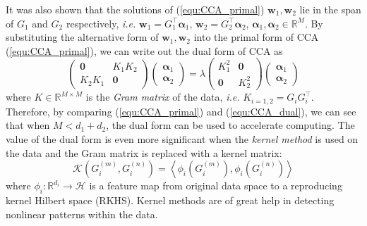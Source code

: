 \documentclass[a4paper]{article}
\begin{document}
It was also shown that the solutions of (\ref{equ:CCA_primal})  $\mathbf{w}_1, \mathbf{w}_2$ lie in the span of $G_1$ and $G_2$ respectively, \emph{i.e.} 
$\mathbf{w}_1=G_1^\top\boldsymbol{\alpha}_1 $, $\mathbf{w}_2=G_2^\top\boldsymbol{\alpha}_2 $, $\boldsymbol{\alpha}_1,\boldsymbol{\alpha}_2\in \mathbb{R}^M$. By substituting the alternative form 
of $\mathbf{w}_1, \mathbf{w}_2$ into the primal form of CCA (\ref{equ:CCA_primal}), we can write out the dual form of CCA \citep{Bie_05,HardoonSS04} as
\small
\begin{equation}
    \left(\begin{array}{cc}
        \mathbf{0} & K_1 K_2 \\
        K_2 K_1     & \mathbf{0}
    \end{array}
    \right) 
    \left( \begin{array}{c} \boldsymbol{\alpha}_1\\ \boldsymbol{\alpha}_2 \end{array} \right)= 
    \lambda 
    \left(\begin{array}{cc}
        K_{1}^2 & \mathbf{0} \\
        \mathbf{0}  & K_{2}^2
    \end{array}
    \right)
    \left( \begin{array}{c} \boldsymbol{\alpha}_1\\ \boldsymbol{\alpha}_2 \end{array} \right)
    \label{equ:CCA_dual}
\end{equation}
\normalsize
where $K\in\mathbb{R}^{M\times M}$ is the \emph{Gram matrix} of the data, \emph{i.e.} $K_{i=1,2}=G_i G_i^\top$.  Therefore, by comparing (\ref{equ:CCA_primal}) and (\ref{equ:CCA_dual}), we can see that 
when $M<d_1+d_2$, the dual form can be used to accelerate computing. The value of the dual form is even more significant when the \emph{kernel method} is used on the data 
and the Gram matrix is replaced with a kernel matrix: 
\begin{equation}
    \mathcal{K}(G_i^{(m)}, G_i^{(n)})=\left\langle \phi_i(G_i^{(m)}),\phi_i(G_i^{(n)}) \right\rangle
    \label{equ:kernel}
\end{equation}
where $\phi_i:\mathbb{R}^{d_i} \to \mathcal{H}$ is a feature map from original data space to a reproducing kernel Hilbert space (RKHS). Kernel methods are of great help in detecting nonlinear patterns within the data.    
\end{document}
